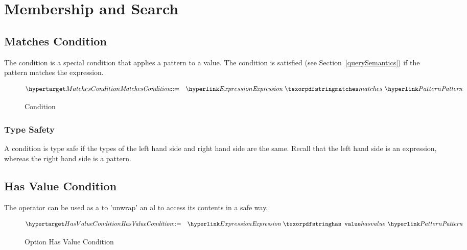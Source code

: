 \section{Membership and Search}
\label{membershipCondition}


\subsection{Matches Condition}
The  condition is a special condition that applies a pattern to a value. The condition is satisfied (see Section~\vref{querySemantics}) if the pattern matches the expression.

\begin{figure}[htbp]
\begin{eqnarray*}
\ntDef{MatchesCondition}&\arrow&\ntRef{Expression}\ \q{matches}\ \ntRef{Pattern}
\end{eqnarray*}
\caption{ Condition}
\label{matchesPredicateFig}
\end{figure}

\subsubsection{Type Safety}
A  condition is type safe if the types of the left hand side and right hand side are the same. Recall that the left hand side is an expression, whereas the right hand side is a pattern.

\begin{prooftree}
\end{prooftree}


\subsection{Has Value Condition}
\label{optionUnwrap}

The  operator can be used as a  to 'unwrap' an al to access its contents in a safe way.

\begin{figure}[htbp]
\begin{eqnarray*}
\ntDef{HasValueCondition}&\arrow&\ntRef{Expression}\ \q{has value}\ \ntRef{Pattern}
\end{eqnarray*}
\caption{Option Has Value Condition}\label{optionUnwrapFig}
\end{figure}

